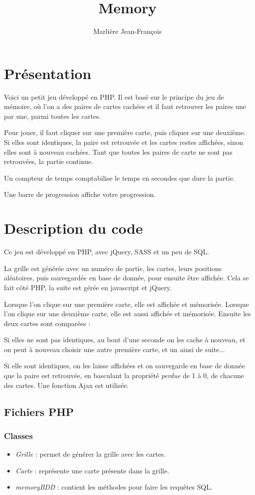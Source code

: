 \documentclass[a4paper,french,12pt]{article}
\title{Memory}
\author{Marlière Jean-François}
\begin{document}
\maketitle
\section{Présentation} 
Voici un petit jeu développé en PHP. Il est basé sur le principe du jeu de mémoire, où l'on a des paires de cartes cachées et il faut retrouver les paires une par une, parmi toutes les cartes.

Pour jouer, il faut cliquer sur une première carte, puis cliquer sur une deuxième. Si elles sont identiques, la paire est retrouvée et les cartes restes affichées, sinon elles sont à nouveau cachées. Tant que toutes les paires de carte ne sont pas retrouvées, la partie continue.

Un compteur de temps comptabilise le temps en secondes que dure la partie. 

Une barre de progression affiche votre progression.

\section{Description du code}
Ce jeu est développé en PHP, avec jQuery, SASS et un peu de SQL.

La grille est générée avec un numéro de partie, les cartes, leurs positions aléatoires, puis sauvegardée en base de donnée, pour ensuite être affichée. Cela se fait côté PHP, la suite est gérée en javascript et jQuery.

Lorsque l'on clique sur une première carte, elle est affichée et mémorisée. Lorsque l'on clique sur une deuxième carte, elle est aussi affichée et mémorisée. Ensuite les deux cartes sont comparées :

Si elles ne sont pas identiques, au bout d'une seconde on les cache à nouveau, et on peut à nouveau choisir une autre première carte, et un ainsi de suite...

Si elle sont identiques, on les laisse affichées et on sauvegarde en base de donnée que la paire est retrouvée, en basculant la propriété \textit{perdue} de 1 à 0, de chacune des cartes. Une fonction Ajax est utilisée.


\subsection{Fichiers PHP}
\subsubsection{Classes}
\begin{itemize}
	\item \textit{Grille} : permet de générer la grille avec les cartes.
	\item \textit{Carte} : représente une carte présente dans la grille.
	\item \textit{memoryBDD} : contient les méthodes pour faire les requêtes SQL.
\end{itemize}
\end{document}
